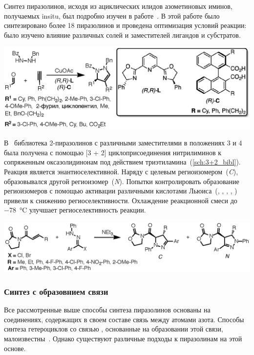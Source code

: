 Синтез пиразолинов, исходя из ациклических илидов азометиновых иминов, получаемых \ac{insitu}, был подробно изучен в работе~\cite{Hashimoto2013}.
В этой работе было синтезировано более \num{18} пиразолинов и проведена оптимизация условий реакции: было изучено влияние различных солей  и заместителей лигандов и субстратов.

\begin{scheme}[h!]
    \centering
    \includegraphics{sections/literature/img/cycloaddition_example.eps}
    \caption{}
    \label{sch:cycloaddition_example}
\end{scheme}

В~\cite{Manyem2007} библиотека 2-пиразолинов с различными заместителями в положениях 3 и 4 была получена с помощью [3 + 2] циклоприсоединения нитрилиминов к сопряженным оксазолидинонам под действием триэтиламина~(\ref{sch:3+2_bibl}).
Реакция является энантиоселективной. Наряду с целевым региоизомером~(\emph{C}), образовывался другой региоизомер~(\emph{N}).
Попытки контролировать образование региоизомеров с помощью активации различными кислотами Льюиса~(, , , , ) привели к снижению региоселективности.
Охлаждение реакционной смеси до \SI{-78}{\celsius} улучшает региоселективность реакции.

\begin{scheme}[h!]
    \centering
    \includegraphics{sections/literature/img/3+2_bibl.eps}
    \caption{}
    \label{sch:3+2_bibl}
\end{scheme}
\FloatBarrier{}

\subsubsection{Синтез с образовнием связи }
Все рассмотренные выше способы синтеза пиразолинов основаны на соединениях, содержащих в своем составе связь между атомами азота.
Способы синтеза гетероциклов со связью , основанные на образовании этой связи, малоизвестны~\cite{Guo2017}.
Однако существуют различные подходы к пиразолинам на этой основе.

